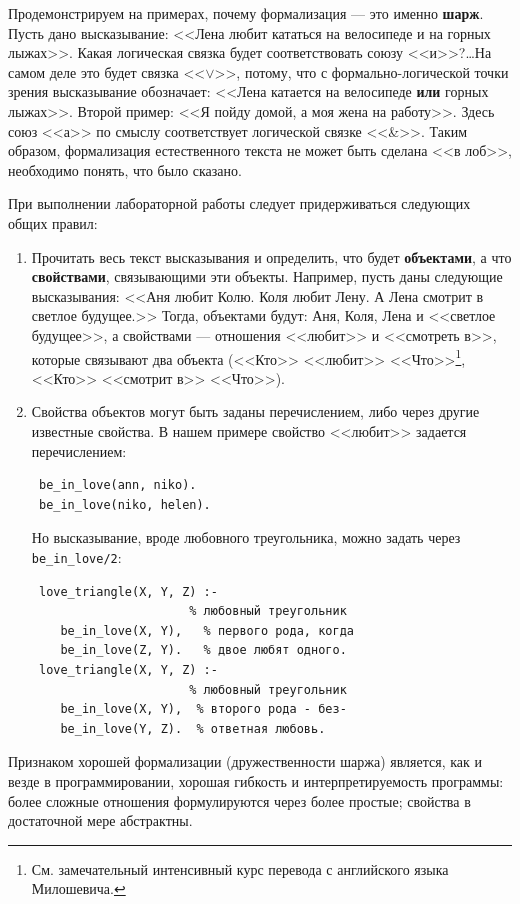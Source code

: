 \documentclass[12pt, openany, twoside]{book} %
\begin{document}
Продемонстрируем на примерах, почему формализация --- это именно {\bf шарж}. Пусть дано высказывание: <<Лена любит кататься на велосипеде и на горных лыжах>>. Какая логическая связка будет соответствовать союзу <<и>>?\ldots На самом деле это будет связка <<$\vee$>>, потому, что с формально-логической точки зрения высказывание обозначает: <<Лена катается на велосипеде {\bf или} горных лыжах>>. Второй пример: <<Я пойду домой, а моя жена на работу>>. Здесь союз <<а>> по смыслу соответствует логической связке <<\&>>. Таким образом, формализация естественного текста не может быть сделана <<в лоб>>, необходимо понять, что было сказано.

При выполнении лабораторной работы следует придерживаться следующих общих правил:
\begin{enumerate}
\item Прочитать весь текст высказывания и определить, что будет {\bf объектами}, а что {\bf свойствами}, связывающими эти объекты. Например, пусть даны следующие высказывания: <<Аня любит Колю. Коля любит Лену. А Лена смотрит в светлое будущее.>> Тогда, объектами будут: Аня, Коля, Лена и <<светлое будущее>>, а свойствами --- отношения <<любит>> и <<смотреть в>>, которые связывают два объекта (<<Кто>> <<любит>>
<<Что>>\footnote{См. замечательный интенсивный курс перевода с английского языка Милошевича.}, <<Кто>> <<смотрит в>> <<Что>>).
\item Свойства объектов могут быть заданы перечислением, либо через другие известные свойства. В нашем примере свойство <<любит>> задается перечислением:
{\tt\begin{verbatim}
 be_in_love(ann, niko).
 be_in_love(niko, helen).
\end{verbatim}}
\noindent Но высказывание, вроде любовного треугольника, можно задать через {\tt be\_in\_love/2}:
{\tt\begin{verbatim}
 love_triangle(X, Y, Z) :-
                      % любовный треугольник
    be_in_love(X, Y),   % первого рода, когда
    be_in_love(Z, Y).   % двое любят одного.
 love_triangle(X, Y, Z) :-
                      % любовный треугольник
    be_in_love(X, Y),  % второго рода - без-
    be_in_love(Y, Z).  % ответная любовь.
\end{verbatim}}
\end{enumerate}

Признаком хорошей формализации (дружественности шаржа) является, как и везде в программировании, хорошая гибкость и интерпретируемость программы: более сложные отношения формулируются через более простые; свойства в достаточной мере абстрактны.
\end{document}
